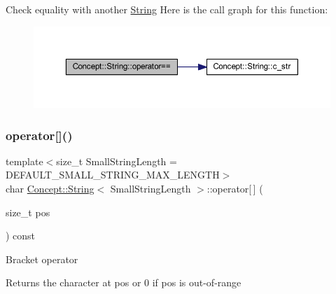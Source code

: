 Check equality with another \mbox{\hyperlink{class_concept_1_1_string}{String}} Here is the call graph for this function\+:\nopagebreak
\begin{figure}[H]
\begin{center}
\leavevmode
\includegraphics[width=350pt]{class_concept_1_1_string_a2359210adcec96fe1923c13616594686_cgraph}
\end{center}
\end{figure}
\mbox{\label{class_concept_1_1_string_a0ba9ca748e183ec075f4950b6e71ddec}} 
\subsubsection{\texorpdfstring{operator[]()}{operator[]()}}
{\footnotesize\ttfamily template$<$size\+\_\+t Small\+String\+Length = D\+E\+F\+A\+U\+L\+T\+\_\+\+S\+M\+A\+L\+L\+\_\+\+S\+T\+R\+I\+N\+G\+\_\+\+M\+A\+X\+\_\+\+L\+E\+N\+G\+TH$>$ \\
char \mbox{\hyperlink{class_concept_1_1_string}{Concept\+::\+String}}$<$ Small\+String\+Length $>$\+::operator\mbox{[}$\,$\mbox{]} (\begin{DoxyParamCaption}\item[{size\+\_\+t}]{pos }\end{DoxyParamCaption}) const\hspace{0.3cm}{\ttfamily [inline]}}

Bracket operator \begin{DoxyReturn}{Returns}
the character at pos or 0 if pos is out-\/of-\/range 
\end{DoxyReturn}
\mbox{\label{class_concept_1_1_string_a6b828c71bd29fbc4f965f4abde5eeb4f}} 
